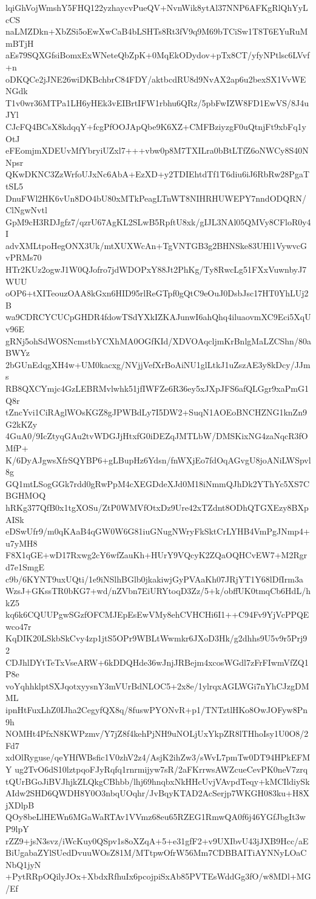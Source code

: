 lqiGhVojWmshY5FHQ122yzhaycvPueQV+NvnWik8ytAl37NNP6AFKgRlQhYyLcCS
naLMZDkn+XbZSi5oEwXwCaB4bLSHTs8Rt3fV9q9M69bTCiSw1T8T6EYuRuMmBTjH
aEs79SQXGfsiBomxExWNeteQbZpK+0MqEkODydov+pTx8CT/yfyNPtlsc6LVvf+n
oDKQCe2jJNE26wiDKBchbrC84FDY/aktbcdRU8d9NvAX2ap6u2bexSX1VvWENGdk
T1v0wr36MTPa1LH6yHEk3vEIBrtIFW1rbhu6QRz/5pbFwIZW8FD1EwVS/8J4uJYl
CJcFQ4BCsX8kdqqY+fcgPfOOJApQbe9K6XZ+CMFBziyzgF0uQtnjFt9xbFq1yOtJ
eFEomjmXDEUvMfYbryiUZxl7+++vbw0p8M7TXILra0bBtLTfZ6oNWCy8S40NNpsr
QKwDKNC3ZzWrfoUJxNc6AbA+EzXD+y2TDIEhtdTf1T6diu6iJ6RbRw28PgaTtSL5
DnuFWl2HK6vUn8DO4bU80xMTkPeagLTnWT8NIHRHUWEPY7nndODQRN/ClNgwNvtl
GpM9cH3RDJgfz7/qzrU67AgKL2SLwB5RpftU8xk/gIJL3NAl05QMVy8CFloR0y4I
advXMLtpoHegONX3Uk/mtXUXWcAn+TgVNTGB3g2BHNSke83UHl1VywvcGvPRMs70
HTr2KUz2ogwJ1W0QJofro7jdWDOPxY88Jt2PhKg/Ty8RwcLg51FXxVuwnbyJ7WUU
oOP6+tXITeouzOAA8kGxn6HID95rlReGTpf0gQtC9eOuJ0DsbJsc17HT0YhLUj2B
wa9CDRCYCUCpGHDR4fdowTSdYXkIZKAJunwI6ahQhq4iluaovmXC9Eci5XqUv96E
gRNj5ohSdWOSNcmstbYCXhMA0OGfKId/XDVOAqcljmKrBnlgMaLZCShn/80aBWYz
2bGUnEdqgXH4w+UM0kacxg/NVjjVefXrBoAiNU1glLtkJ1uZszAE3y8kDcy/JJms
RB8QXCYmjc4GzLEBRMvlwhk51jfIWFZe6R36ey5xJXpJFS6afQLGgr9xaPmG1Q8r
tZncYvi1CiRAglWOsKGZ8gJPWBdLy7I5DW2+SuqN1AOEoBNCHZNG1knZn9G2kKZy
4GuA0/9IcZtyqGAu2tvWDGJjHtxfG0iDEZqJMTLbW/DMSKixNG4zaNqcR3fOMfP+
K/6DyAJgwsXfrSQYBP6+gLBupHz6Ydsn/fnWXjEo7fdOqAGvgU8joANiLWSpvl8g
GQ1mtLSogGGk7rdd0gRwPpM4cXEGDdeXJd0M18iNmmQJhDk2YThYc5XS7CBGHMOQ
hRKg377QfB0x1tgXOSu/ZtP0WMVfOtxDz9Ure42xTZdnt8ODhQTGXEzy8BXpAISk
eDSwUfr9/m0qKAaB4qGW0W6G81iuGNugNWryFkSktCrLYHB4VmPgJNmp4+u7yMH8
F8X1qGE+wD17Rxwg2cY6wfZauKh+HUrY9VQcyK2ZQaOQHCvEW7+M2Rgrd7e1SmgE
c9b/6KYNT9uxUQti/1e9iNSlhBGlb0jkakiwjGyPVAaKh07JRjYT1Y68lDfIrm3a
WzsJ+GKssTR0bKG7+wd/nZVbn7EiURYtoqD3Zz/5+k/obffUK0tmqCb6HdL/hkZ5
kq6k6CQUUPgwSGzfOFCMJEpEsEwVMy8ehCVHCHi6I1++C94Fv9YjVcPPQEwco47r
KqDIK20LSkbSkCvy4zp1jtS5OPr9WBLtWwmkr6JXoD3Hk/g2dhhs9U5v9r5Prj92
CDJhlDYtTeTxVseARW+6kDDQHde36wJnjJRBejm4xcosWGdl7zFrFIwmVfZQ1P8e
voYqhhklptSXJqotxyysnY3mVUrBdNLOC5+2x8e/1ylrqxAGLWGi7nYhCJzgDMML
ipnHtFuxLhZ0IJha2CegyfQX8q/8fuswPYONvR+p1/TNTztlHKo8OwJOFyw8Pn9h
NOMHt4PfxN8KWPzmv/Y7jZ8f4kehPjNH9uNOLjUxYkpZR8lTHhoIsy1U0O8/2Fd7
xdOlRyguse/qeYHfWBsfic1V0zhV2z4/AsjK2ihZw3/sWvL7pmTw0DT94HPkEFMY
ug2TvO6dS10lztpqoFJyRqfq1rnrmijyw7sR/2aFKrrwsAWZcueCevPK0neV7zrq
tQUrBGoJiBVJhjkZLQkgCBhbb/lhj69hnqbxNkHHcUvjVAvpdTeqy+kMCIldiySk
AIdw2SHD6QWDH8Y0O3nbqUOqhr/JvBqyKTAD2AcSerjp7WKGH083ku+H8XjXDlpB
QOy8beLlHEWn6MGaWaRTAv1VVmz68eu65RZEG1RmwQA0f6j46YGfJbgIt3wP9lpY
rZZ9+jsN3svz/iWcKuy0QSpv1s8oXZqA+5+e31gfF2+v9UXIbvU43jJXB9Hcc/aE
BiUgabaZYlSUedDvuuWOsZ81M/MTtpwOfrW56Mm7CDBBAITiAYNNyLOaCNbQ1jyN
+PytRRpOQilyJOx+XbdxRfhuIx6pcojpiSxAb85PVTEsWddGg3fO/w8MDl+MG/Ef
